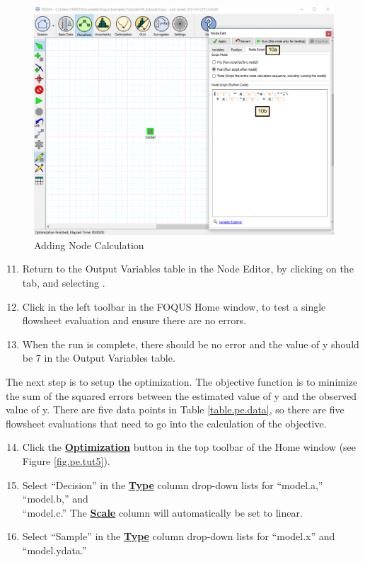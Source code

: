 \begin{figure}[H]
	\begin{center}
		\includegraphics[scale=0.55]{Chapt_optimization/figs/par_est_tut4}
		\caption{Adding Node Calculation}
		\label{fig.pe.tut4}
	\end{center}
\end{figure}

\begin{enumerate}
	\setcounter{enumi}{10}
	\item Return to the Output Variables table in the Node Editor, by clicking on the  tab, and selecting .
	\item Click  in the left toolbar in the FOQUS Home window, to test a single flowsheet evaluation and ensure there are no errors.
	\item When the run is complete, there should be no error and the value of y should be 7 in the Output Variables table.
\end{enumerate}

The next step is to setup the optimization. The objective function is to minimize the sum of the squared errors between the estimated value of y and the observed value of y. There are five data points in Table \ref{table.pe.data}, so there are five flowsheet evaluations that need to go into the calculation of the objective.

\begin{enumerate}
	\setcounter{enumi}{13}
	\item Click the \textbf{\underline{Optimization}} button in the top toolbar of the Home window (see Figure \ref{fig.pe.tut5}).
	\item Select ``Decision'' in the \textbf{\underline{Type}} column drop-down lists for ``model.a,'' ``model.b,'' and \\``model.c.'' The \textbf{\underline{Scale}} column will automatically be set to linear.
	\item Select ``Sample'' in the \textbf{\underline{Type}} column drop-down lists for ``model.x'' and ``model.ydata.''
\end{enumerate}

